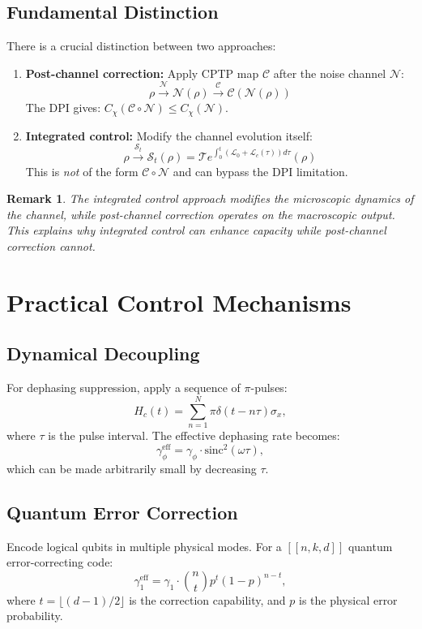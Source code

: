 \documentclass[11pt]{article}
\newtheorem{remark}[theorem]{Remark}
\begin{document}
\subsection{Fundamental Distinction}
There is a crucial distinction between two approaches:

\begin{enumerate}
\item \textbf{Post-channel correction:} Apply CPTP map $\mathcal{C}$ after the noise channel $\mathcal{N}$:
\[
\rho \xrightarrow{\mathcal{N}} \mathcal{N}(\rho) \xrightarrow{\mathcal{C}} \mathcal{C}(\mathcal{N}(\rho))
\]
The DPI gives: $C_\chi(\mathcal{C}\circ\mathcal{N}) \leq C_\chi(\mathcal{N})$.

\item \textbf{Integrated control:} Modify the channel evolution itself:
\[
\rho \xrightarrow{\mathcal{S}_t} \mathcal{S}_t(\rho) = \mathcal{T} e^{\int_0^t (\mathcal{L}_0 + \mathcal{L}_c(\tau)) d\tau} (\rho)
\]
This is \textit{not} of the form $\mathcal{C}\circ\mathcal{N}$ and can bypass the DPI limitation.
\end{enumerate}

\begin{remark}
The integrated control approach modifies the \textit{microscopic dynamics} of the channel, while post-channel correction operates on the \textit{macroscopic output}. This explains why integrated control can enhance capacity while post-channel correction cannot.
\end{remark}

\section{Practical Control Mechanisms}
\subsection{Dynamical Decoupling}
For dephasing suppression, apply a sequence of $\pi$-pulses:
\[
H_c(t) = \sum_{n=1}^N \pi \delta(t - n\tau) \sigma_x,
\]
where $\tau$ is the pulse interval. The effective dephasing rate becomes:
\[
\gamma_\phi^{\text{eff}} = \gamma_\phi \cdot \text{sinc}^2(\omega\tau),
\]
which can be made arbitrarily small by decreasing $\tau$.

\subsection{Quantum Error Correction}
Encode logical qubits in multiple physical modes. For a $[[n,k,d]]$ quantum error-correcting code:
\[
\gamma_1^{\text{eff}} = \gamma_1 \cdot \binom{n}{t} p^t (1-p)^{n-t},
\]
where $t = \lfloor (d-1)/2 \rfloor$ is the correction capability, and $p$ is the physical error probability.
\end{document}
